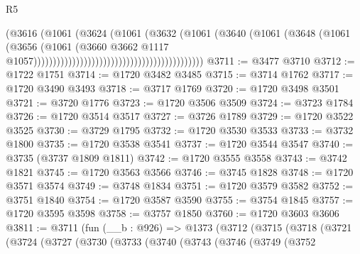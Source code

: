 \begin{lexlean}{R5}
\begin{coremodule}
                                                                  (@3616
                                                                    (@1061
                                                                      (@3624
                                                                        (@1061
                                                                          (@3632
                                                                            (@1061
                                                                              (@3640
                                                                                (@1061
                                                                                  (@3648
                                                                                    (@1061
                                                                                      (@3656
                                                                                        (@1061
                                                                                          (@3660
                                                                                            @3662
                                                                                            @1117
                                                                                            @1057))))))))))))))))))))))))))))))))))))))))))))
@3711 := @3477 @3710
@3712 := @1722 @1751
@3714 := @1720 @3482 @3485
@3715 := @3714 @1762
@3717 := @1720 @3490 @3493
@3718 := @3717 @1769
@3720 := @1720 @3498 @3501
@3721 := @3720 @1776
@3723 := @1720 @3506 @3509
@3724 := @3723 @1784
@3726 := @1720 @3514 @3517
@3727 := @3726 @1789
@3729 := @1720 @3522 @3525
@3730 := @3729 @1795
@3732 := @1720 @3530 @3533
@3733 := @3732 @1800
@3735 := @1720 @3538 @3541
@3737 := @1720 @3544 @3547
@3740 := @3735 (@3737 @1809 @1811)
@3742 := @1720 @3555 @3558
@3743 := @3742 @1821
@3745 := @1720 @3563 @3566
@3746 := @3745 @1828
@3748 := @1720 @3571 @3574
@3749 := @3748 @1834
@3751 := @1720 @3579 @3582
@3752 := @3751 @1840
@3754 := @1720 @3587 @3590
@3755 := @3754 @1845
@3757 := @1720 @3595 @3598
@3758 := @3757 @1850
@3760 := @1720 @3603 @3606
@3811 := @3711
    (fun (__b : @926) =>
    @1373
      (@3712
        (@3715
          (@3718
            (@3721
              (@3724
                (@3727
                  (@3730
                    (@3733
                      (@3740
                        (@3743
                          (@3746
                            (@3749
                              (@3752

\end{coremodule}
\end{lexlean}
